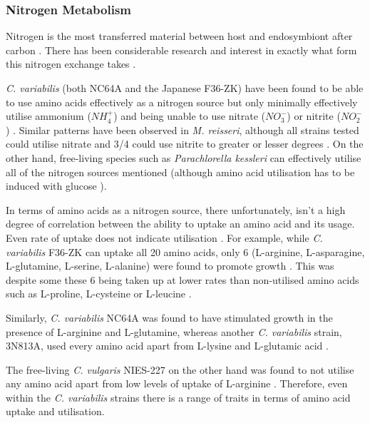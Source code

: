 \subsubsection{Nitrogen Metabolism}

Nitrogen is the most transferred material between host and endosymbiont
after carbon \citep{Kato2009a}.  There has been considerable research and interest
in exactly what form this nitrogen exchange takes \citep{Kato2006,Kamako2005,McAuley1986}.


\textit{C. variabilis} (both NC64A and the Japanese F36-ZK) have been 
found to be able to use amino acids effectively as a nitrogen source but
only minimally effectively utilise ammonium (\(NH_4^{+}\)) and being unable to use
nitrate (\(NO_3^{-}\)) or nitrite (\(NO_2^{-}\)) \citep{Kamako2005,Kato2009}.
Similar patterns have been observed in \textit{M. reisseri}, although
all strains tested could utilise nitrate and 3/4 could use nitrite
to greater or lesser degrees \citep{Kessler1990}.
On the other hand, free-living species such as \textit{Parachlorella
kessleri} can effectively utilise all of the nitrogen sources mentioned \citep{Kato2009a} 
(although amino acid utilisation has to be induced with glucose \citep{Cho1981}).


In terms of amino acids as a nitrogen source, there unfortunately, isn't
a high degree of correlation between the ability to uptake an amino acid
and its usage.  Even rate of uptake does not indicate 
utilisation \citep{Kato2009a}.
For example, while \textit{C. variabilis} F36-ZK can
uptake all 20 amino acids, only 6 (L-arginine, L-asparagine,
L-glutamine, L-serine, L-alanine) were found to promote growth \citep{Kato2006}.
This was despite some these 6 being taken up at lower rates
than non-utilised amino acids such as L-proline, L-cysteine or L-leucine \citep{Kato2006}.

Similarly, \textit{C. variabilis} NC64A was found to have stimulated growth
in the presence of L-arginine and L-glutamine, whereas another \textit{C. variabilis}
strain, 3N813A, used every amino acid apart from L-lysine and L-glutamic acid \citep{McAuley1986,Kato2009a}.

%
The free-living \textit{C. vulgaris} NIES-227 on the other hand was found to not utilise
any amino acid apart from low levels of uptake of L-arginine \citep{Kato2006}.
Therefore, even within the \textit{C. variabilis} strains there is a range 
of traits in terms of amino acid uptake and utilisation.


